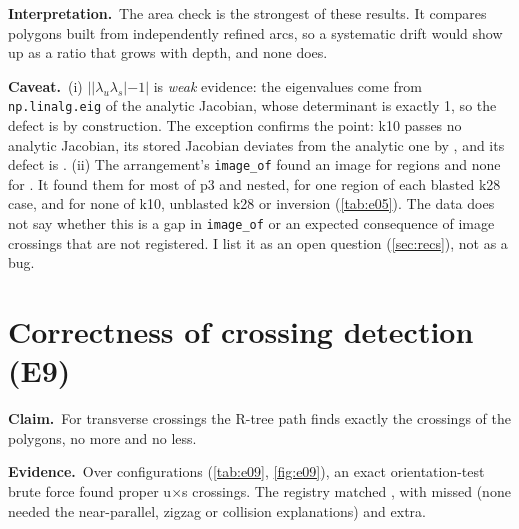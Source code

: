\documentclass[11pt,a4paper]{article}
\newcommand{\claim}{\par\smallskip\noindent\textbf{Claim.}~}
\newcommand{\evidence}{\par\smallskip\noindent\textbf{Evidence.}~}
\newcommand{\reading}{\par\smallskip\noindent\textbf{Interpretation.}~}
\newcommand{\caveat}{\par\smallskip\noindent\textbf{Caveat.}~}
\newcommand{\code}[1]{\texttt{#1}}
\begin{document}
\reading The area check is the strongest of these results. It compares
polygons built from independently refined arcs, so a systematic drift
would show up as a ratio that grows with depth, and none does.

\caveat (i) $||\lambda_u\lambda_s|-1|$ is \emph{weak} evidence: the
eigenvalues come from \code{np.linalg.eig} of the analytic Jacobian, whose
determinant is exactly 1, so the defect is
\NumDetDefectMaxAnalytic{} by construction. The exception confirms the
point: k10 passes no analytic Jacobian, its stored Jacobian deviates from
the analytic one by \NumJacDevKTen, and its defect is \NumDetDefectKTen.
(ii) The arrangement's \code{image\_of} found an image for
\NumArrImageFound{} regions and none for \NumArrImageMissing. It found them
for most of p3 and nested, for one region of each blasted k28 case, and for
none of k10, unblasted k28 or inversion (\cref{tab:e05}). The data does not
say whether this is a gap in \code{image\_of} or an expected consequence of
image crossings that are not registered. I list it as an open question
(\cref{sec:recs}), not as a bug.

\section{Correctness of crossing detection (E9)}
\label{sec:intersections}

\claim For transverse crossings the R-tree path finds exactly the crossings
of the polygons, no more and no less.

\evidence Over \NumIsectConfigs{} configurations (\cref{tab:e09},
\cref{fig:e09}), an exact orientation-test brute force found
\NumIsectBruteTotal{} proper u$\times$s crossings. The registry matched
\NumIsectMatchedTotal{}, with \NumIsectMissedTotal{} missed (none needed the
near-parallel, zigzag or collision explanations) and \NumIsectExtraTotal{}
extra.

\begin{table}[htbp]
\centering\footnotesize
\caption{E9: crossings against brute force, summed per case. $^*$Some
configurations were too large for the harness's u$\times$u check. ``lib.''
is the library's own same-stability diagnostic (WP1): u$\times$u and
s$\times$s crossings in the tangle box, and any outside it.}
\label{tab:e09}
\setlength{\tabcolsep}{3pt}
\end{table}
\end{document}
